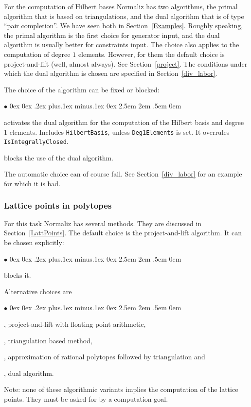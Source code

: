 \documentclass[12pt,a4paper]{scrartcl}
\newcommand{\stdli}{ \topsep0ex \partopsep0ex %
\parsep.2ex plus.1ex minus.1ex \itemsep0ex%
\leftmargin2.5em \labelwidth2em \labelsep.5em \rightmargin0em}%
\renewenvironment{itemize}{\begin{list}{{$\bullet$}}{\stdli}}{\end{list}}
\theoremstyle{definition}
\def\itemtt[#1]{\item[\textbf{\ttt{#1}}]}
\def\ttt{\texttt}
\begin{document}
For the computation of Hilbert bases Normaliz has two algorithms, the primal algorithm that is based on triangulations, and the dual algorithm that is of type ``pair completion''. We have seen both in Section~\ref{Examples}. Roughly speaking, the primal algorithm is the first choice for generator input, and the dual algorithm is usually better for constraints input. The choice also applies to the computation of degree $1$ elements. However, for them the default choice is project-and-lift (well, almost always). See Section~\ref{project}. The conditions under which the dual algorithm is chosen are specified in Section~\ref{div_labor}.

The choice of the algorithm can be fixed or blocked:
\begin{itemize}
	\itemtt[DualMode, -d] activates the dual algorithm for the computation of the Hilbert basis and degree $1$ elements. Includes \verb|HilbertBasis|, unless \verb|Deg1Elements| is set. It overrules \verb|IsIntegrallyClosed|.
	
	\itemtt[PrimalMode, -P] blocks the use of the dual algorithm.
\end{itemize}

The automatic choice can of course fail. See Section~\ref{div_labor} for an example for which it is bad.

\subsubsection{Lattice points in polytopes}\label{approximate}

For this task Normaliz has several methods. They are discussed in Section~\ref{LattPoints}. The default choice is the project-and-lift algorithm. It can be chosen explicitly:
\begin{itemize}
	\itemtt[Projection, -j]
	
	\itemtt[NoProjection] blocks it.
\end{itemize}

Alternative choices are
\begin{itemize}
	\itemtt[ProjectionFloat, -J], project-and-lift with floating point arithmetic,
	\itemtt[PrimalMode, -P], triangulation based method,
	\itemtt [Approximate, -r], approximation of rational polytopes followed by triangulation and
	\itemtt[DualMode, -d], dual algorithm.
\end{itemize}
Note: none of these algorithmic variants implies the computation of the lattice points. They must be asked for by a computation goal.
\end{document}
